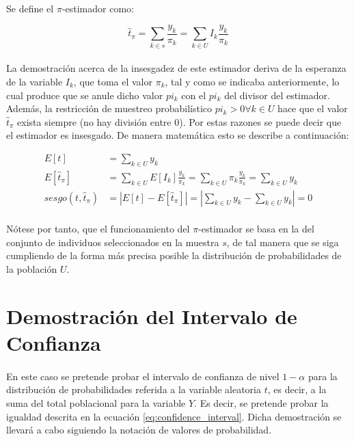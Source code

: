 \documentclass{article}
\begin{document}
    \paragraph{}
    Se define el $\pi$-estimador como:

    \begin{equation}
      \widehat{t}_\pi = \sum_{k \in s} \frac{y_k}{\pi_k} = \sum_{k \in U} I_k \frac{y_k}{\pi_k}
    \end{equation}

    \paragraph{}
    La demostración acerca de la insesgadez de este estimador deriva de la esperanza de la variable $I_k$, que toma el valor $\pi_k$, tal y como se indicaba anteriormente, lo cual produce que se anule dicho valor $pi_k$ con el $pi_k$  del divisor del estimador. Además, la restricción de muestreo probabilístico $pi_k > 0 \forall k \in U$ hace que el valor $\widehat{t}_\pi$ exista siempre (no hay división entre 0). Por estas razones se puede decir que el estimador es insesgado. De manera matemática esto se describe a continuación:

    \begin{align}
      E[t] &= \sum_{k \in U} y_k \\
      E[\widehat{t}_\pi] &= \sum_{k \in U} E[I_k] \frac{y_k}{\pi_k} = \sum_{k \in U} \pi_k \frac{y_k}{\pi_k} =\sum_{k \in U} y_k \\
      sesgo(t, \widehat{t}_\pi) &= \left| E[t] - E[\widehat{t}_\pi] \right| = \left| \sum_{k \in U} y_k - \sum_{k \in U} y_k \right| = 0
    \end{align}

    \paragraph{}
    Nótese por tanto, que el funcionamiento del $\pi$-estimador se basa en la  del conjunto de individuos seleccionados en la muestra $s$, de tal manera que se siga cumpliendo de la forma más precisa posible la distribución de probabilidades de la población $U$.

  \section{Demostración del Intervalo de Confianza}
  \label{sec:demostration_2}

    \paragraph{}
    En este caso se pretende probar el intervalo de confianza de nivel $1-\alpha$ para la distribución de probabilidades referida a la variable aleatoria $t$, es decir, a la suma del total poblacional para la variable $Y$. Es decir, se pretende probar la igualdad descrita en la ecuación \eqref{eq:confidence_interval}. Dicha demostración se llevará a cabo siguiendo la notación de valores de probabilidad.
\end{document}
